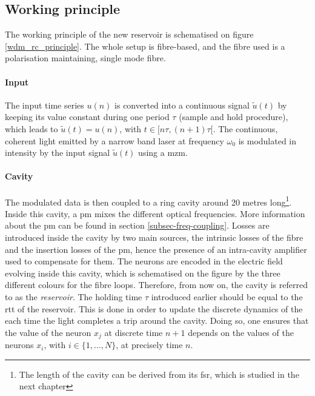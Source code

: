 
\subsection{Working principle}

The working principle of the new reservoir is schematised on figure \ref{wdm_rc_principle}. The whole setup is fibre-based, and the fibre used is a polarisation maintaining, single mode fibre. 

\paragraph{Input}

The input time series $u(n)$ is converted into a continuous signal $\tilde{u}(t)$ by keeping its value constant during one period $\tau$ (sample and hold procedure), which leads to $\tilde{u}(t)=u(n)$, with $t \in [n\tau, (n+1)\tau[$. The continuous, coherent light emitted by a narrow band laser at frequency $\omega_0$ is modulated in intensity by the input signal $\tilde{u}(t)$ using a \gls{mzm}.  

\paragraph{Cavity}

The modulated data is then coupled to a ring cavity around 20 metres long\footnote{The length of the cavity can be derived from its \gls{fsr}, which is studied in the next chapter}. Inside this cavity, a \gls{pm} mixes the different optical frequencies. More information about the \gls{pm} can be found in section \ref{subsec-freq-coupling}. Losses are introduced inside the cavity by two main sources, the intrinsic losses of the fibre and the insertion losses of the \gls{pm}, hence the presence of an intra-cavity amplifier used to compensate for them. The neurons are encoded in the electric field evolving inside this cavity, which is schematised on the figure by the three different colours for the fibre loops. Therefore, from now on, the cavity is referred to as the \textit{reservoir}. The holding time $\tau$ introduced earlier should be equal to the \gls{rtt} of the reservoir. This is done in order to update the discrete dynamics of the \rcer each time the light completes a trip around the cavity. Doing so, one ensures that the value of the neuron $x_j$ at discrete time $n+1$ depends on the values of the neurons $x_i$, with $i \in \{1,\dots, N\}$, at precisely time $n$. 

